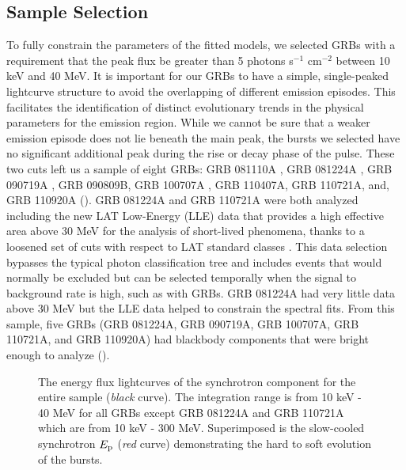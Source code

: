 \subsection{Sample Selection}
To fully constrain the parameters of the fitted models, we selected
GRBs with a requirement that the peak flux be greater than 5 photons
s$^{-1}$ cm$^{-2}$ between 10 keV and 40 MeV. It is important for our
GRBs to have a simple, single-peaked lightcurve structure to avoid the
overlapping of different emission episodes. This facilitates the
identification of distinct evolutionary trends in the physical
parameters for the emission region. While we cannot be sure that a
weaker emission episode does not lie beneath the main peak, the bursts
we selected have no significant additional peak during the rise or
decay phase of the pulse. These two cuts left us a sample of eight
GRBs: GRB 081110A \cite{GRB081110A}, GRB 081224A \cite{GRB081224A},
GRB 090719A \cite{GRB090719A}, GRB 090809B, GRB 100707A \cite{
  GRB100707A}, GRB 110407A, GRB 110721A, \cite{GRB110721A} and, GRB
110920A (). GRB 081224A and GRB 110721A were both
analyzed including the new LAT Low-Energy (LLE) data that provides a
high effective area above 30 MeV for the analysis of short-lived
phenomena, thanks to a loosened set of cuts with respect to LAT
standard classes \cite{Vero:2010, Ack:2012a}. This data selection
bypasses the typical photon classification \cite{Ackerman:2012} tree
and includes events that would normally be excluded but can be
selected temporally when the signal to background rate is high, such
as with GRBs. GRB 081224A had very little data above 30 MeV but the
LLE data helped to constrain the spectral fits. From this sample, five
GRBs (GRB 081224A, GRB 090719A, GRB 100707A, GRB 110721A, and GRB
110920A) had blackbody components that were bright enough to analyze
().


\begin{figure}

 \centering




  \caption{The energy flux lightcurves of the synchrotron component
    for the entire sample (\emph{black} curve). The integration range
    is from 10 keV - 40 MeV for all GRBs except GRB 081224A and GRB
    110721A which are from 10 keV - 300 MeV. Superimposed is the
    slow-cooled synchrotron $E_{\rm p}$ (\emph{red} curve) demonstrating the
    hard to soft evolution of the bursts. }

  \label{fig:lc}

\end{figure}


